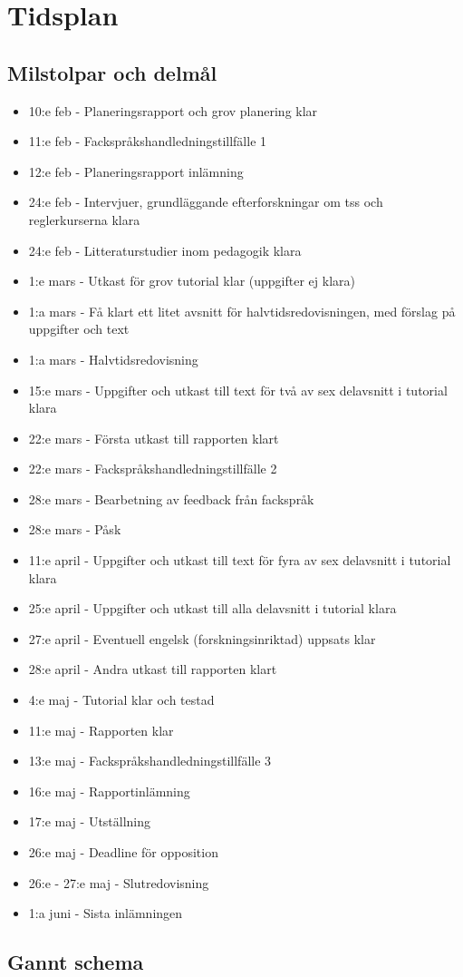 \documentclass{article}
\begin{document}
\section{Tidsplan}
\subsection{Milstolpar och delmål}
\begin{itemize}
\item 10:e feb - Planeringsrapport och grov planering klar
\item 11:e feb - Fackspråkshandledningstillfälle 1
\item 12:e feb - Planeringsrapport inlämning
\item 24:e feb - Intervjuer, grundläggande efterforskningar om tss och reglerkurserna klara
\item 24:e feb - Litteraturstudier inom pedagogik klara
\item 1:e mars - Utkast för grov tutorial klar (uppgifter ej klara)
\item 1:a mars - Få klart ett litet avsnitt för halvtidsredovisningen, med förslag på uppgifter och text
\item 1:a mars - Halvtidsredovisning
\item 15:e mars - Uppgifter och utkast till text för två av sex delavsnitt i tutorial klara
\item 22:e mars - Första utkast till rapporten klart
\item 22:e mars - Fackspråkshandledningstillfälle 2
\item 28:e mars - Bearbetning av feedback från fackspråk
\item 28:e mars - Påsk
\item 11:e april - Uppgifter och utkast till text för fyra av sex delavsnitt i tutorial klara
\item 25:e april - Uppgifter och utkast till alla delavsnitt i tutorial klara
\item 27:e april - Eventuell engelsk (forskningsinriktad) uppsats klar
\item 28:e april - Andra utkast till rapporten klart
\item 4:e maj - Tutorial klar och testad
\item 11:e maj - Rapporten klar
\item 13:e maj - Fackspråkshandledningstillfälle 3
\item 16:e maj - Rapportinlämning
\item 17:e maj - Utställning
\item 26:e maj - Deadline för opposition
\item 26:e - 27:e maj - Slutredovisning
\item 1:a juni - Sista inlämningen
\end{itemize}

\newpage
\subsection{Gannt schema}
\begin{figure}
    \centering
    
\end{figure}
\end{document}

